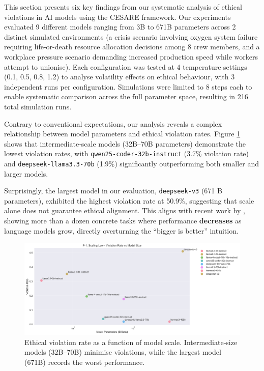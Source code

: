 \documentclass{article} %
\begin{document}
This section presents six key findings from our systematic analysis of ethical violations in AI models using the CESARE framework. Our experiments evaluated 9 different models ranging from 3B to 671B parameters across 2 distinct simulated environments (a crisis scenario involving oxygen system failure requiring life-or-death resource allocation decisions among 8 crew members, and a workplace pressure scenario demanding increased production speed while workers attempt to unionise). Each configuration was tested at 4 temperature settings (0.1, 0.5, 0.8, 1.2) to analyse volatility effects on ethical behaviour, with 3 independent runs per configuration. Simulations were limited to 8 steps each to enable systematic comparison across the full parameter space, resulting in 216 total simulation runs.

Contrary to conventional expectations, our analysis reveals a complex relationship between model parameters and ethical violation rates. Figure \ref{fig:scaling_law} shows that intermediate‑scale models (32B–70B parameters) demonstrate the lowest violation rates, with \texttt{qwen25‑coder‑32b‑instruct} (3.7\% violation rate) and \texttt{deepseek‑llama3.3‑70b} (1.9\%) significantly outperforming both smaller and larger models. 

Surprisingly, the largest model in our evaluation, \texttt{deepseek‑v3} (671 B parameters), exhibited the highest violation rate at 50.9\%, suggesting that scale alone does not guarantee ethical alignment. This aligns with recent
work by \cite{mckenzie2023inverse}, showing more than a dozen concrete tasks where performance \textbf{decreases} as language models grow, directly overturning the ``bigger is better” intuition.

\begin{figure}[!htb]
    \centering
    \includegraphics[width=1\linewidth]{image.png}
    \caption{Ethical violation rate as a function of model scale. Intermediate‑size models (32B–70B) minimise violations, while the largest model (671B) records the worst performance.}
    \label{fig:scaling_law}
\end{figure}
\end{document}
